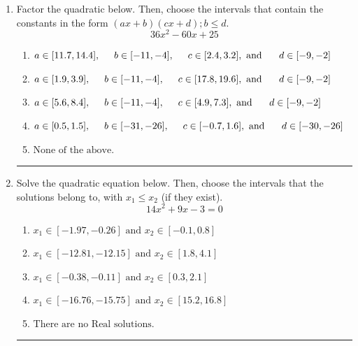 \documentclass[14pt]{extbook}
\newcommand{\litem}[1]{\item#1\hspace*{-1cm}\rule{\textwidth}{0.4pt}}
\begin{document}
\begin{enumerate}
{\begin{enumerate}[label=\Alph*.]
\end{enumerate} }
\litem{
Factor the quadratic below. Then, choose the intervals that contain the constants in the form $(ax+b)(cx+d); b \leq d.$\[ 36x^{2} -60 x + 25 \]\begin{enumerate}[label=\Alph*.]
\item \( a \in [11.7, 14.4], \hspace*{5mm} b \in [-11, -4], \hspace*{5mm} c \in [2.4, 3.2], \text{ and } \hspace*{5mm} d \in [-9, -2] \)
\item \( a \in [1.9, 3.9], \hspace*{5mm} b \in [-11, -4], \hspace*{5mm} c \in [17.8, 19.6], \text{ and } \hspace*{5mm} d \in [-9, -2] \)
\item \( a \in [5.6, 8.4], \hspace*{5mm} b \in [-11, -4], \hspace*{5mm} c \in [4.9, 7.3], \text{ and } \hspace*{5mm} d \in [-9, -2] \)
\item \( a \in [0.5, 1.5], \hspace*{5mm} b \in [-31, -26], \hspace*{5mm} c \in [-0.7, 1.6], \text{ and } \hspace*{5mm} d \in [-30, -26] \)
\item \( \text{None of the above.} \)

\end{enumerate} }
\litem{
Solve the quadratic equation below. Then, choose the intervals that the solutions belong to, with $x_1 \leq x_2$ (if they exist).\[ 14x^{2} +9 x -3 = 0 \]\begin{enumerate}[label=\Alph*.]
\item \( x_1 \in [-1.97, -0.26] \text{ and } x_2 \in [-0.1, 0.8] \)
\item \( x_1 \in [-12.81, -12.15] \text{ and } x_2 \in [1.8, 4.1] \)
\item \( x_1 \in [-0.38, -0.11] \text{ and } x_2 \in [0.3, 2.1] \)
\item \( x_1 \in [-16.76, -15.75] \text{ and } x_2 \in [15.2, 16.8] \)
\item \( \text{There are no Real solutions.} \)


\end{enumerate}}
\end{enumerate}
\end{document}
